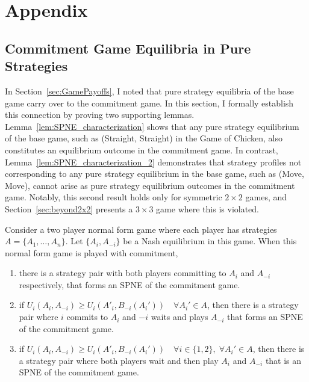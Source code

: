 \documentclass[../paper.tex]{subfiles}
\begin{document}
\section*{Appendix}
\appendix
{}
\setcounter{subsection}{0}
\renewcommand\thesubsection{\Alph{subsection}}
\subsection{Commitment Game Equilibria in Pure Strategies}\label{sec:proof1}
In Section~\ref{sec:GamePayoffs}, I noted that pure strategy equilibria of the base game carry over to the commitment game. In this section, I formally establish this connection by proving two supporting lemmas. Lemma~\ref{lem:SPNE_characterization} shows that any pure strategy equilibrium of the base game, such as (Straight, Straight) in the Game of Chicken, also constitutes an equilibrium outcome in the commitment game. In contrast, Lemma~\ref{lem:SPNE_characterization_2} demonstrates that strategy profiles not corresponding to any pure strategy equilibrium in the base game, such as (Move, Move), cannot arise as pure strategy equilibrium outcomes in the commitment game. Notably, this second result holds only for symmetric $2\times2$ games, and Section~\ref{sec:beyond2x2} presents a $3\times3$ game where this is violated.
\begin{lemma}[]\label{lem:SPNE_characterization}
    Consider a two player normal form game where each player has strategies $A=\{A_1,\dots,A_n\}$. Let $\{A_i, A_{-i}\}$ be a Nash equilibrium in this game. When this normal form game is played with commitment,
    \begin{enumerate}
        \item there is a strategy pair with both players committing to $A_i$ and $A_{-i}$ respectively, that forms an SPNE of the commitment game.
        
        \item if $U_i(A_i, A_{-i})\geq U_i(A'_i, B_{-i}(A_i'))\quad \forall A_i'\in A$, then there is a strategy pair where $i$ commits to $A_i$ and $-i$ waits and plays $A_{-i}$ that forms an SPNE of the commitment game.
        
        \item if $U_i(A_i, A_{-i})\geq U_i(A'_i, B_{-i}(A_i'))\quad \forall i\in\{1,2\},\; \forall A_i'\in A$, then there is a strategy pair where both players wait and then play $A_i$ and $A_{-i}$ that is an SPNE of the commitment game.
    \end{enumerate}
\end{lemma}
\end{document}
